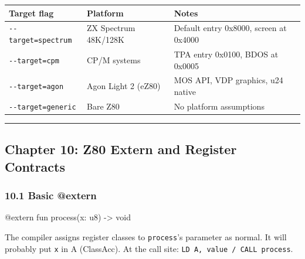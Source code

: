 \documentclass[
  11pt,
  a4paper,
]{report}
\newenvironment{Shaded}{\begin{snugshade}\small}{\end{snugshade}}
\newcommand{\NormalTok}[1]{#1}
\begin{document}
\begin{longtable}[]{@{}
  >{\raggedright\arraybackslash}p{}
  >{\raggedright\arraybackslash}p{}
  >{\raggedright\arraybackslash}p{}@{}}
\toprule\noalign{}
\begin{minipage}[b]{\linewidth}\raggedright
Target flag
\end{minipage} & \begin{minipage}[b]{\linewidth}\raggedright
Platform
\end{minipage} & \begin{minipage}[b]{\linewidth}\raggedright
Notes
\end{minipage} \\
\midrule\noalign{}
\endhead
\bottomrule\noalign{}
\endlastfoot
\texttt{-\/-target=spectrum} & ZX Spectrum 48K/128K & Default entry
0x8000, screen at 0x4000 \\
\texttt{-\/-target=cpm} & CP/M systems & TPA entry 0x0100, BDOS at
0x0005 \\
\texttt{-\/-target=agon} & Agon Light 2 (eZ80) & MOS API, VDP graphics,
u24 native \\
\texttt{-\/-target=generic} & Bare Z80 & No platform assumptions \\
\end{longtable}

\begin{center}\rule{0.5\linewidth}{0.5pt}\end{center}

\subsection{Chapter 10: Z80 Extern and Register
Contracts}\label{chapter-10-z80-extern-and-register-contracts}

\subsubsection{10.1 Basic @extern}\label{basic-extern}

\begin{Shaded}
\begin{Highlighting}[]
\NormalTok{@extern fun process(x: u8) {-}\textgreater{} void}
\end{Highlighting}
\end{Shaded}

The compiler assigns register classes to \texttt{process}'s parameter as
normal. It will probably put \texttt{x} in A (ClassAcc). At the call
site: \texttt{LD\ A,\ value\ /\ CALL\ process}.
\end{document}
